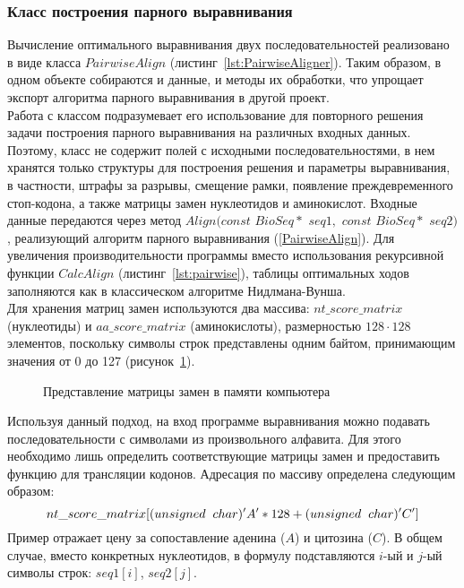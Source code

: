 \subsubsection[Класс построения парного выравнивания]{\large Класс построения парного выравнивания}
\hspace{\parindent} Вычисление оптимального выравнивания двух последовательностей реализовано в виде класса $PairwiseAlign$ (листинг~\ref{lst:PairwiseAligner}). Таким образом, в одном объекте собираются и данные, и методы их обработки, что упрощает экспорт алгоритма парного выравнивания в другой проект.\\
\indent Работа с классом подразумевает его использование для повторного решения задачи построения парного выравнивания на различных входных данных. Поэтому, класс не содержит полей с исходными последовательностями, в нем хранятся только структуры для построения решения и параметры выравнивания, в частности, штрафы за разрывы, смещение рамки, появление преждевременного стоп-кодона, а также матрицы замен нуклеотидов и аминокислот. Входные данные передаются через метод $Align(const$ $BioSeq*$ $seq1,$ $const$ $BioSeq*$ $seq2)$, реализующий алгоритм парного выравнивания (\ref{PairwiseAlign}). Для увеличения производительности программы вместо использования рекурсивной функции $CalcAlign$ (листинг~\ref{lst:pairwise}), таблицы оптимальных ходов заполняются как в классическом алгоритме Нидлмана-Вунша.\\
\indent Для хранения матриц замен используются два массива: $nt\_score\_matrix$ (нуклеотиды) и $aa\_score\_matrix$ (аминокислоты), размерностью $128\cdot 128$ элементов, поскольку символы строк представлены одним байтом, принимающим значения от 0 до 127 (рисунок~\ref{ris:memory}).
\begin{figure}[H]
	\caption{Представление матрицы замен в памяти компьютера}
	\label{ris:memory}
\end{figure}
\indent Используя данный подход, на вход программе выравнивания можно подавать последовательности с символами из произвольного алфавита. Для этого необходимо лишь определить соответствующие матрицы замен и предоставить функцию для трансляции кодонов. Адресация по массиву определена следующим образом:
\begin{equation*}
nt\_score\_matrix[(unsigned\hspace{0.2cm} char)'A'*128+(unsigned\hspace{0.2cm} char)'C']
\end{equation*}
Пример отражает цену за сопоставление аденина ($A$) и цитозина ($C$). В общем случае, вместо конкретных нуклеотидов, в формулу подставляются $i$-ый и $j$-ый символы строк: $seq1[i]$, $seq2[j]$.


